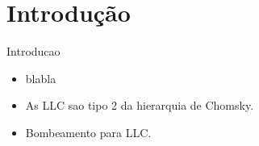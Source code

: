 
\section{Introdução}



\begin{frame}{Introducao\cite{Vieira2006}}
	
	\begin{itemize}
	\item blabla
	\pause
	\item As LLC sao tipo 2 da hierarquia de Chomsky.
	\pause
	\item Bombeamento para LLC.
	\end{itemize} 
	 
\end{frame}

